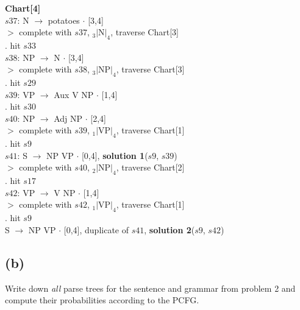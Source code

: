 \documentclass[twoside,11pt]{homework}
\begin{document}
\begin{solution}
  \textbf{Chart[4]}\\
  $s37$: N $\rightarrow$ potatoes $\cdot$ [3,4]\\
  $>$ complete with $s37$, $_3|$N$|_4$, traverse Chart[3]\\
  $.$ hit $s33$\\
  $s38$: NP $\rightarrow$ N $\cdot$ [3,4]\\
  $>$ complete with $s38$, $_3|$NP$|_4$, traverse Chart[3]\\
  $.$ hit $s29$\\
  $s39$: VP $\rightarrow$ Aux V NP $\cdot$ [1,4]\\
  $.$ hit $s30$\\
  $s40$: NP $\rightarrow$ Adj NP $\cdot$ [2,4]\\
  $>$ complete with $s39$, $_1|$VP$|_4$, traverse Chart[1]\\
  $.$ hit $s9$\\
  $s41$: S $\rightarrow$ NP VP $\cdot$ [0,4], \textbf{solution 1}($s9$, $s39$)\\
  $>$ complete with $s40$, $_2|$NP$|_4$, traverse Chart[2]\\
  $.$ hit $s17$\\
  $s42$: VP $\rightarrow$ V NP $\cdot$ [1,4]\\
  $>$ complete with $s42$, $_1|$VP$|_4$, traverse Chart[1]\\
  $.$ hit $s9$\\
  S $\rightarrow$ NP VP $\cdot$ [0,4], duplicate of $s41$, \textbf{solution 2}($s9$, $s42$)\\
  
\end{solution}

\subsection*{(b)}
\begin{prob}
  Write down \textit{all} parse trees for the sentence and grammar from problem
  2 and compute their probabilities according to the PCFG.
\end{prob}
\end{document}
